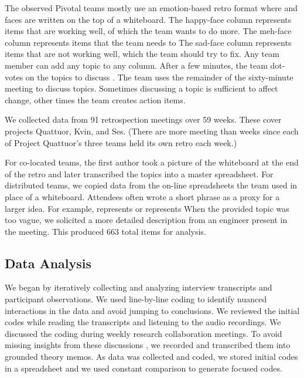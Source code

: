 The observed Pivotal teams mostly use an emotion-based retro format where   and  faces are written on the top of a whiteboard. The happy-face column represents items that are working well, of which the team wants to do more. The meh-face column represents  items that the team needs to  The sad-face column represents items that are not working well, which the team should try to fix. Any team member can add any topic to any column. After a few minutes, the team dot-votes on the topics to discuss \cite{DerbyAgileRetrospectives}. The team uses the remainder of the sixty-minute meeting to discuss topics. Sometimes discussing a topic is sufficient to affect change, other times the team creates action items. 

We collected data from 91 retrospection meetings over 59 weeks. These cover projects Quattuor, Kvin, and Ses. (There are more meeting than weeks since each of Project Quattuor's three teams held its own retro each week.)

For co-located teams, the first author took a picture of the whiteboard at the end of the retro and later transcribed the topics into a master spreadsheet. For distributed teams, we copied data from the on-line spreadsheets the team used in place of a whiteboard. Attendees often wrote a short phrase as a proxy for a larger idea. For example,  represents  or  represents  When the provided topic was too vague, we solicited a more detailed description from an engineer present in the meeting. This produced 663 total items for analysis. 
\subsection{Data Analysis}
We began by iteratively collecting and analyzing interview transcripts and participant observations. We used line-by-line coding \cite{Charmaz} to identify nuanced interactions in the data and avoid jumping to conclusions. We reviewed the initial codes while reading the transcripts and listening to the audio recordings. We discussed the coding during weekly research collaboration meetings. To avoid missing insights from these discussions \cite{GlaserTheoreticalSensitivity}, we recorded and transcribed them into grounded theory memos. As data was collected and coded, we stored initial codes in a spreadsheet and we used constant comparison to generate focused codes.

